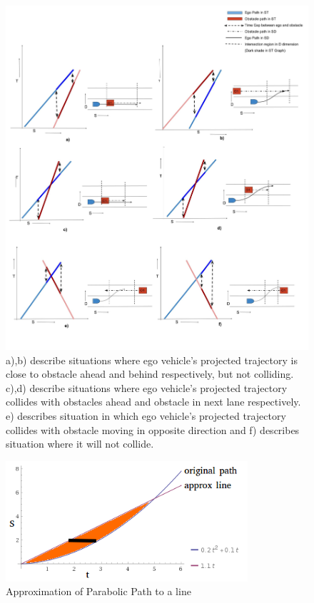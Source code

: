 \begin{figure}
	\centering
	\includegraphics[width=1.1\textwidth]{Images/concept/dynamic_collision_lines.jpg}
	\caption{a),b) describe situations where ego vehicle's projected trajectory is close to obstacle ahead and behind respectively, but not colliding. \newline 
		c),d) describe situations where ego vehicle's projected trajectory collides with obstacles ahead and obstacle in next lane respectively. \newline
		e) describes situation in which ego vehicle's projected trajectory collides with obstacle moving in opposite direction and f) describes situation where it will not collide. 
	}
	\label{dynamic_obst_all}
\end{figure}


 \begin{figure}
	\centering
	\includegraphics[width=0.8\textwidth]{Images/concept/dynamic_approx.png}
	\caption{Approximation of Parabolic Path to a line}
	\label{dynamic_approx}
\end{figure}

